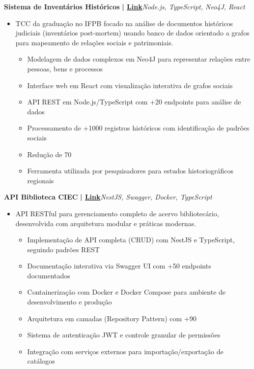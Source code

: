 \documentclass[a4paper]{article}
\begin{document}
{\textbf{Sistema de Inventários Históricos}}\textbf{ | \href{https://repositorio.ifpb.edu.br/handle/177683/2898}{Link}}\hfill{\sl Node.js, TypeScript, Neo4J, React}\\
\vspace{-3mm}
\begin{itemize} \itemsep -3pt
    \item[] TCC da graduação no IFPB focado na análise de documentos históricos judiciais (inventários post-mortem) usando banco de dados orientado a grafos para mapeamento de relações sociais e patrimoniais.
        \begin{itemize}
            \item Modelagem de dados complexos em Neo4J para representar relações entre pessoas, bens e processos
            \item Interface web em React com visualização interativa de grafos sociais
            \item API REST em Node.js/TypeScript com +20 endpoints para análise de dados
            \item Processamento de +1000 registros históricos com identificação de padrões sociais
            \item Redução de 70%
            \item Ferramenta utilizada por pesquisadores para estudos historiográficos regionais
        \end{itemize}
\end{itemize}
\vspace*{2mm}

{\textbf{API Biblioteca CIEC}}\textbf{ | \href{https://github.com/Alttabcorp/API-bibliteca_siec}{Link}}\hfill{\sl NestJS, Swagger, Docker, TypeScript}\\
\vspace{-3mm}
\begin{itemize} \itemsep -3pt
    \item[] API RESTful para gerenciamento completo de acervo bibliotecário, desenvolvida com arquitetura modular e práticas modernas.
        \begin{itemize}
            \item Implementação de API completa (CRUD) com NestJS e TypeScript, seguindo padrões REST
            \item Documentação interativa via Swagger UI com +50 endpoints documentados
            \item Containerização com Docker e Docker Compose para ambiente de desenvolvimento e produção
            \item Arquitetura em camadas (Repository Pattern) com +90%
            \item Sistema de autenticação JWT e controle granular de permissões
            \item Integração com serviços externos para importação/exportação de catálogos
        \end{itemize}
\end{itemize}
\vspace*{2mm}
\end{document}
